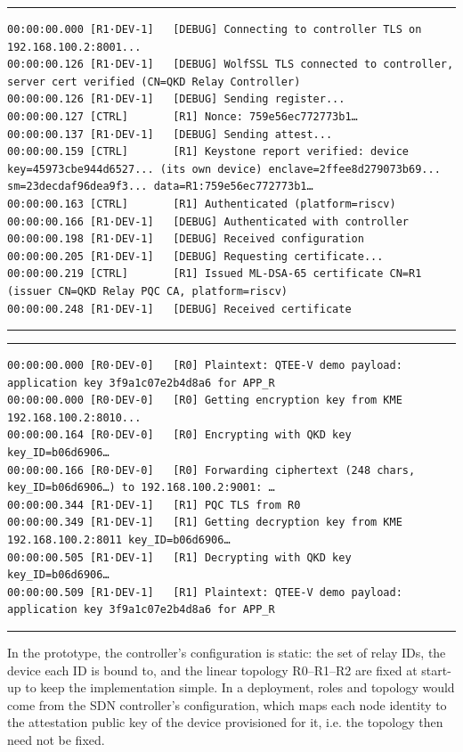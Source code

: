 \documentclass[futureinternet,article,submit,moreauthors]{Definitions/mdpi}
\begin{document}
\begin{listing}[H]
\caption{Attestation logs.\label{lst:attestation_logs}}
\rule{\columnwidth}{1pt}
\begin{lstlisting}
00:00:00.000 [R1·DEV-1]   [DEBUG] Connecting to controller TLS on 192.168.100.2:8001...
00:00:00.126 [R1·DEV-1]   [DEBUG] WolfSSL TLS connected to controller, server cert verified (CN=QKD Relay Controller)
00:00:00.126 [R1·DEV-1]   [DEBUG] Sending register...
00:00:00.127 [CTRL]       [R1] Nonce: 759e56ec772773b1…
00:00:00.137 [R1·DEV-1]   [DEBUG] Sending attest...
00:00:00.159 [CTRL]       [R1] Keystone report verified: device key=45973cbe944d6527... (its own device) enclave=2ffee8d279073b69... sm=23decdaf96dea9f3... data=R1:759e56ec772773b1…
00:00:00.163 [CTRL]       [R1] Authenticated (platform=riscv)
00:00:00.166 [R1·DEV-1]   [DEBUG] Authenticated with controller
00:00:00.198 [R1·DEV-1]   [DEBUG] Received configuration
00:00:00.205 [R1·DEV-1]   [DEBUG] Requesting certificate...
00:00:00.219 [CTRL]       [R1] Issued ML-DSA-65 certificate CN=R1 (issuer CN=QKD Relay PQC CA, platform=riscv)
00:00:00.248 [R1·DEV-1]   [DEBUG] Received certificate
\end{lstlisting}
\rule{\columnwidth}{1pt}
\end{listing}

\begin{listing}[H]
\caption{Message exchange logs.\label{lst:forwarding_logs}}
\rule{\columnwidth}{1pt}
\begin{lstlisting}
00:00:00.000 [R0·DEV-0]   [R0] Plaintext: QTEE-V demo payload: application key 3f9a1c07e2b4d8a6 for APP_R
00:00:00.000 [R0·DEV-0]   [R0] Getting encryption key from KME 192.168.100.2:8010...
00:00:00.164 [R0·DEV-0]   [R0] Encrypting with QKD key key_ID=b06d6906…
00:00:00.166 [R0·DEV-0]   [R0] Forwarding ciphertext (248 chars, key_ID=b06d6906…) to 192.168.100.2:9001: …
00:00:00.344 [R1·DEV-1]   [R1] PQC TLS from R0
00:00:00.349 [R1·DEV-1]   [R1] Getting decryption key from KME 192.168.100.2:8011 key_ID=b06d6906…
00:00:00.505 [R1·DEV-1]   [R1] Decrypting with QKD key key_ID=b06d6906…
00:00:00.509 [R1·DEV-1]   [R1] Plaintext: QTEE-V demo payload: application key 3f9a1c07e2b4d8a6 for APP_R
\end{lstlisting}
\rule{\columnwidth}{1pt}
\end{listing}

In the prototype, the controller's configuration is static: the set of relay IDs, the device each ID is bound to, and the linear topology R0--R1--R2 are fixed at start-up to keep the implementation simple. In a deployment, roles and topology would come from the SDN controller's configuration, which maps each node identity to the attestation public key of the device provisioned for it, i.e. the topology then need not be fixed.
\end{document}
